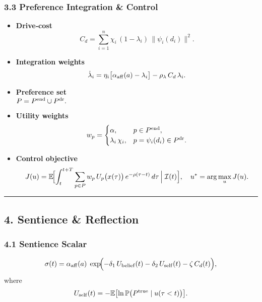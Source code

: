 \documentclass[
]{article}
\providecommand{\tightlist}{%
  \setlength{\itemsep}{0pt}\setlength{\parskip}{0pt}}
\begin{document}
\hypertarget{preference-integration-control}{%
\subsubsection{3.3 Preference Integration \&
Control}\label{preference-integration-control}}

\begin{itemize}
\tightlist
\item
  \textbf{Drive‐cost}\\
  \[
    C_d = \sum_{i=1}^n \chi_i\,(1-\lambda_i)\,\|\psi_i(d_i)\|^2.
  \]
\item
  \textbf{Integration weights}\\
  \[
    \dot\lambda_i
      = \eta_i\bigl[\alpha_{\rm aff}(a)-\lambda_i\bigr]
      - \rho_\lambda\,C_d\,\lambda_i.
  \]
\item
  \textbf{Preference set}\\
  \(P = P^{\rm end}\cup P^{\rm dr}.\)\\
\item
  \textbf{Utility weights}\\
  \[
    w_p =
    \begin{cases}
      \alpha, & p\in P^{\rm end},\\
      \lambda_i\,\chi_i, & p=\psi_i(d_i)\in P^{\rm dr}.
    \end{cases}
  \]
\item
  \textbf{Control objective}\\
  \[
    J(u)
    = \mathbb E\!\Bigl[\int_t^{t+T}\sum_{p\in P} w_p\,U_p\bigl(x(\tau)\bigr)\,e^{-\rho(\tau-t)}\,d\tau
      \,\Big|\;\mathcal I(t)\Bigr],\quad
    u^*=\arg\max_u J(u).
  \]
\end{itemize}

\begin{center}\rule{0.5\linewidth}{0.5pt}\end{center}

\hypertarget{sentience-reflection}{%
\subsection{4. Sentience \& Reflection}\label{sentience-reflection}}

\hypertarget{sentience-scalar}{%
\subsubsection{4.1 Sentience Scalar}\label{sentience-scalar}}

\[
\sigma(t)
= \alpha_{\rm aff}(a)\;
  \exp\!\Bigl(-\delta_1\,U_{\rm belief}(t)
              -\delta_2\,U_{\rm self}(t)
              -\zeta\,C_d(t)\Bigr),
\] where\\
\[
U_{\rm self}(t)
= -\mathbb E\bigl[\ln \mathbb P\bigl(P^{\rm true}\mid u(\tau<t)\bigr)\bigr].
\]
\end{document}

